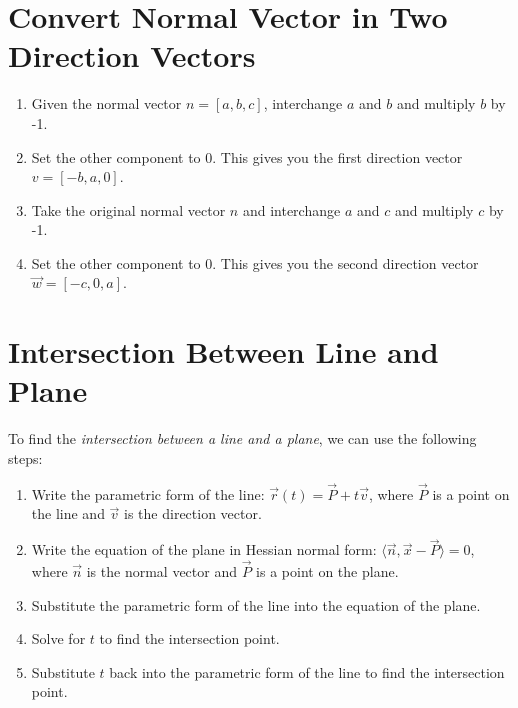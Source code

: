 \section{Convert Normal Vector in Two Direction Vectors}

\begin{enumerate}
	
	\item Given the normal vector \(n = [a, b, c]\), interchange \(a\) and \(b\) and multiply \(b\) by -1.
	
	\item Set the other component to 0. This gives you the first direction vector \(v = [-b, a, 0]\).
	
	\item Take the original normal vector \(n\) and interchange \(a\) and \(c\) and multiply \(c\) by -1.
	
	\item Set the other component to 0. This gives you the second direction vector \(\vec{w} = [-c, 0, a]\).

\end{enumerate}

\section{Intersection Between Line and Plane}

To find the \emph{intersection between a line and a plane}, we can use the following steps:

\begin{enumerate}

	\item Write the parametric form of the line: \(\vec{r}(t) = \vec{P} + t\vec{v}\), where \(\vec{P}\) is a point on the line
	and \(\vec{v}\) is the direction vector.

	\item Write the equation of the plane in Hessian normal form: \(\langle \vec{n}, \vec{x} - \vec{P} \rangle = 0\), where \(\vec{n}\) is 
	the normal vector and \(\vec{P}\) is a point on the plane.

	\item Substitute the parametric form of the line into the equation of the plane.

	\item Solve for \(t\) to find the intersection point.

	\item Substitute \(t\) back into the parametric form of the line to find the intersection point.

\end{enumerate}

